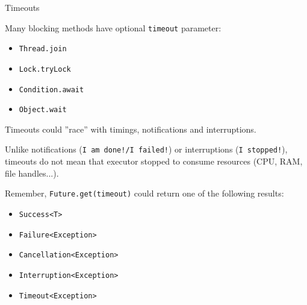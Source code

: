 \begin{frame}{Timeouts}

Many blocking methods have optional \texttt{timeout} parameter:
\begin{itemize}
    \item \texttt{Thread.join}
    \item \texttt{Lock.tryLock}
    \item \texttt{Condition.await}
    \item \texttt{Object.wait}
\end{itemize}

\pause

Timeouts could ''race'' with timings, notifications and interruptions.

\pause

Unlike notifications (\texttt{I am done!/I failed!}) or interruptions (\texttt{I stopped!}), timeouts do not mean that executor stopped to consume resources (CPU, RAM, file handles...).

\pause

Remember, \texttt{Future.get(timeout)} could return one of the following results:
\begin{itemize}
    \item \texttt{Success<T>}
    \item \texttt{Failure<Exception>}
    \item \texttt{Cancellation<Exception>}
    \item \texttt{Interruption<Exception>}
    \item \texttt{Timeout<Exception>}
\end{itemize}
\end{frame}


